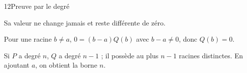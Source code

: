 \begin{corrige}{12}{Preuve par le degré}
\begin{questions}
\item Sa valeur ne change jamais et reste différente de zéro.
\item Pour une racine $b\ne a$, $0=(b-a)Q(b)$ avec $b-a\ne0$, donc $Q(b)=0$.
\item Si $P$ a degré $n$, $Q$ a degré $n-1$ ; il possède au plus $n-1$ racines distinctes. En ajoutant $a$, on obtient la borne $n$.
\end{questions}
\end{corrige}

